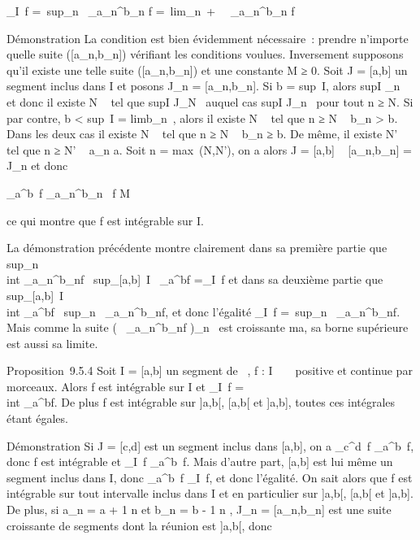 \documentclass[]{article}
\begin{document}
\int  \_I~f =\
sup\_n\int ~
\_a\_n^b\_n f =\
lim\_n\rightarrow~+\infty~\int ~
\_a\_n^b\_n f

Démonstration La condition est bien évidemment nécessaire~: prendre
n'importe quelle suite ({[}a\_n,b\_n{]}) vérifiant les
conditions voulues. Inversement supposons qu'il existe une telle suite
({[}a\_n,b\_n{]}) et une constante M ≥ 0. Soit J =
{[}a,b{]} un segment inclus dans I et posons J\_n =
{[}a\_n,b\_n{]}. Si b = sup~I,
alors supI \in\cupJ\_n~ et donc il existe N
\in \mathbb{N}~ tel que supI \in J\_N~ auquel cas
supI \in J\_n~ pour tout n ≥ N. Si par
contre, b \textless{} sup~I
= limb\_n~, alors il existe N \in {}~ tel
que n ≥ N \rigtharrow~ b\_n \textgreater{} b. Dans les deux cas il existe N
\in {}~ tel que n ≥ N \rigtharrow~ b\_n ≥ b. De même, il existe N' \in \mathbb{N}~ tel que
n ≥ N' \rigtharrow~ a\_n \leq a. Soit n = max~(N,N'),
on a alors J = {[}a,b{]} \subset~ {[}a\_n,b\_n{]} =
J\_n et donc

\int  \_a^b~f
\leq\int  \_a\_n^b\_n~
f \leq M

ce qui montre que f est intégrable sur I.

La démonstration précédente montre clairement dans sa première partie
que sup\_n~\\int
 \_a\_n^b\_nf \leq\
sup\_{[}a,b{]}\subset~I\int ~
\_a^bf =\int  \_I~f et dans
sa deuxième partie que
sup\_{[}a,b{]}\subset~I~\\int
 \_a^bf \leq\
sup\_n\int ~
\_a\_n^b\_nf, et donc l'égalité
\int  \_I~f =\
sup\_n\int ~
\_a\_n^b\_nf. Mais comme la suite
\left (\int ~
\_a\_n^b\_nf\right
)\_n\in{}~ est croissante ma, sa borne supérieure est aussi sa
limite.

Proposition~9.5.4 Soit I = {[}a,b{]} un segment de ~, f : I \rightarrow~ ~ positive
et continue par morceaux. Alors f est intégrable sur I et
\int  \_I~f =\\int
 \_a^bf. De plus f est intégrable sur {]}a,b{[},
{[}a,b{[} et {]}a,b{]}, toutes ces intégrales étant égales.

Démonstration Si J = {[}c,d{]} est un segment inclus dans {[}a,b{]}, on
a \int  \_c^d~f
\leq\int  \_a^b~f, donc f est
intégrable et \int  \_I~f
\leq\int  \_a^b~f. Mais d'autre part,
{[}a,b{]} est lui même un segment inclus dans I, donc
\int  \_a^b~f
\leq\int  \_I~f, et donc l'égalité. On sait
alors que f est intégrable sur tout intervalle inclus dans I et en
particulier sur {]}a,b{[}, {[}a,b{[} et {]}a,b{]}. De plus, si
a\_n = a + 1 \over n et b\_n = b -
1 \over n , J\_n =
{[}a\_n,b\_n{]} est une suite croissante de segments
dont la réunion est {]}a,b{[}, donc
\end{document}
